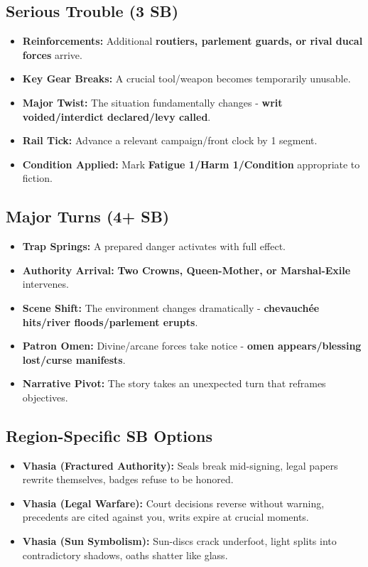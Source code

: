 \subsection*{Serious Trouble (3 SB)}
\begin{itemize}
\item \textbf{Reinforcements:} Additional \textbf{routiers, parlement guards, or rival ducal forces} arrive.
\item \textbf{Key Gear Breaks:} A crucial tool/weapon becomes temporarily unusable.
\item \textbf{Major Twist:} The situation fundamentally changes - \textbf{writ voided/interdict declared/levy called}.
\item \textbf{Rail Tick:} Advance a relevant campaign/front clock by 1 segment.
\item \textbf{Condition Applied:} Mark \textbf{Fatigue 1/Harm 1/Condition} appropriate to fiction.
\end{itemize}

\subsection*{Major Turns (4+ SB)}
\begin{itemize}
\item \textbf{Trap Springs:} A prepared danger activates with full effect.
\item \textbf{Authority Arrival:} \textbf{Two Crowns, Queen-Mother, or Marshal-Exile} intervenes.
\item \textbf{Scene Shift:} The environment changes dramatically - \textbf{chevauchée hits/river floods/parlement erupts}.
\item \textbf{Patron Omen:} Divine/arcane forces take notice - \textbf{omen appears/blessing lost/curse manifests}.
\item \textbf{Narrative Pivot:} The story takes an unexpected turn that reframes objectives.
\end{itemize}

\subsection*{Region-Specific SB Options}
\begin{itemize}
\item \textbf{Vhasia (Fractured Authority):} Seals break mid-signing, legal papers rewrite themselves, badges refuse to be honored.
\item \textbf{Vhasia (Legal Warfare):} Court decisions reverse without warning, precedents are cited against you, writs expire at crucial moments.
\item \textbf{Vhasia (Sun Symbolism):} Sun-discs crack underfoot, light splits into contradictory shadows, oaths shatter like glass.
\end{itemize}


